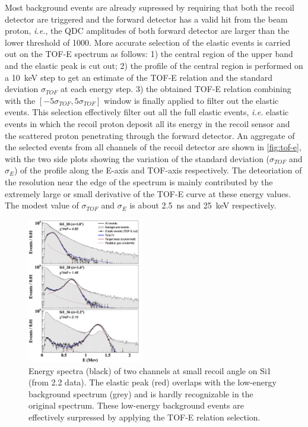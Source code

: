 \documentclass[number,5p]{elsarticle}
\begin{document}
Most background events are already supressed by requiring that both
the recoil detector are triggered and the forward detector has a valid
hit from the beam proton, \textit{i.e.}, the QDC amplitudes of both forward detector
are larger than the lower threshold of \num{1000}.
More accurate selection of the elastic events is carried out on the TOF-E spectrum as follows:
1) the central region of the upper band and the elastic peak is cut out;
2) the profile of the central region is performed on a \SI{10}{\keV} step to get an
estimate of the TOF-E relation and the standard deviation $\sigma_{TOF}$ at each energy step.
3) the obtained TOF-E relation combining with the $[-5\sigma_{TOF}, 5\sigma_{TOF}]$ window is finally applied to filter out the elastic events.
This selection effectively filter out all the full elastic events, \textit{i.e.}
elastic events in which the recoil proton deposit all its energy in the recoil
sensor and the scattered proton penetrating through the forward detector. 
An aggregate of the selected events from all channels of the recoil detector are
shown in \ref{fig:tof-e}, with the two side plots showing the variation of the
standard deviation ($\sigma_{TOF}$ and $\sigma_{E}$) of the profile along the E-axis and TOF-axis respectively.
The deteoriation of the resolution near the edge of the spectrum is mainly
contributed by the extremely large or small derivative of the TOF-E curve at
these energy values.
The modest value of $\sigma_{TOF}$ and $\sigma_{E}$ is about
\SI{2.5}{\nano\second} and \SI{25}{\keV} respectively.

\begin{figure}[h!]
  \centering
  \includegraphics[width=0.45\textwidth]{./tofe_cut_comparison.png}
  \caption{Energy spectra (black) of two channels at small recoil angle on Si1 (from
    \SI{2.2}{\momentum} data). The elastic peak (red) overlaps with the low-energy background
    spectrum (grey) and is hardly recognizable in the original spectrum. These low-energy background events are effectively surpressed by applying the TOF-E relation selection.}
  \label{fig:cut}
\end{figure}
\end{document}

